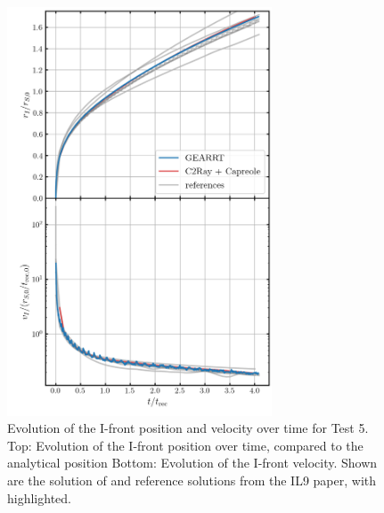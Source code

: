 \begin{figure}
\centering
\includegraphics[width=0.7\textwidth]{figures/RHD/Iliev5/ionization_fronts.png}
\caption{
 Evolution of the I-front position and velocity over time for Test 5.
 Top: Evolution of the I-front position over time, compared to the analytical position
 Bottom: Evolution of the I-front velocity. Shown are the solution of \GEARRT and reference
 solutions from the IL9 paper, with  highlighted.
}
\label{fig:iliev5-Ifront}
\end{figure}




